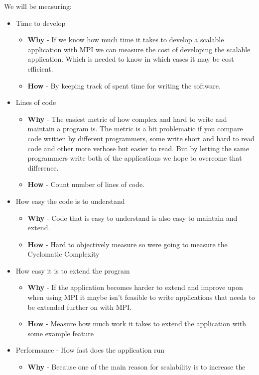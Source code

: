 \documentclass{article}
\begin{document}
We will be measuring:
\begin{itemize}
\item Time to develop
\begin{itemize}
\item{ \textbf{Why} - If we know how much time it takes to develop a scalable application with
MPI we can measure the cost of developing the scalable application. Which is needed to
know in which cases it may be cost efficient.}
\item{ \textbf{How} - By keeping track of spent time for writing the software.}
\end{itemize}
\item Lines of code
\begin{itemize}
\item{ \textbf{Why} - The easiest metric of how complex and hard to write and
 maintain a program is. The metric is a bit problematic if you compare
 code written by different programmers, some write short and hard to read
 code and other more verbose but easier to read. But by letting the same
 programmers write both of the applications we hope to overcome that 
 difference.}
\item{ \textbf{How} - Count number of lines of code.}
\end{itemize}
\item How easy the code is to understand
\begin{itemize}
\item{ \textbf{Why} - Code that is easy to understand is also easy to maintain and extend. }
\item{ \textbf{How} - Hard to objectively measure so were going to measure 
the Cyclomatic Complexity \cite{mccabe1976complexity}  }
\end{itemize}
\item How easy it is to extend the program
\begin{itemize}
\item{ \textbf{Why} - If the application becomes harder to extend and improve upon 
when using MPI it maybe isn't feasible to write applications that
needs to be extended further on with MPI.}
\item{ \textbf{How} - Measure how much work it takes to extend the application with 
		some example feature}
\end{itemize}
\item Performance - How fast does the application run
\begin{itemize}
\item{ \textbf{Why} - Because one of the main reason for scalability is to increase the
}
\end{itemize}
\end{itemize}
\end{document}
